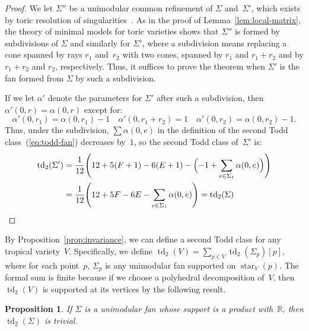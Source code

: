 \documentclass[11pt]{amsart}
\newtheorem{prop}[thm]{Proposition}
\theoremstyle{definition}
\newcommand{\RR}{\mathbb R}
\newcommand{\td}{\operatorname{td}}
\begin{document}
\begin{proof}
We let $\Sigma''$ be a unimodular common refinement of $\Sigma$ and~$\Sigma'$,
which exists by toric resolution of singularities~\cite[Sec.~2.6]{fulton-toric}.
As in the proof of Lemma~\ref{lem:local-matrix}, the theory of
minimal models for toric varieties shows that $\Sigma''$ is formed by
subdivisions of $\Sigma$ and similarly for $\Sigma'$, where a subdivision means
replacing a cone spanned by rays $r_1$ and~$r_2$ with two cones, spanned by
$r_1$ and $r_1 + r_2$ and by $r_1+r_2$ and $r_2$, respectively. Thus, it
suffices to prove the theorem when $\Sigma'$ is the fan formed from $\Sigma$ by
such a subdivision.

If we let $\alpha'$ denote the parameters for $\Sigma'$ after such a
subdivision, then $\alpha'(0,r) = \alpha(0,r)$ except for:
\begin{equation*}
\alpha'(0, r_1) = \alpha(0, r_1) -1 \quad \alpha'(0, r_1 + r_2) = 1
\quad \alpha'(0, r_2) = \alpha(0, r_2) - 1.
\end{equation*}
Thus, under the subdivision, $\sum \alpha(0,e)$ in the definition of the second
Todd class~(\ref{eq:todd-fan}) decreases by~$1$, so the second Todd class
of~$\Sigma'$ is:
\begin{align*}
\td_2(\Sigma') &=
\frac{1}{12} \Bigg( 12 + 5(F+1) - 6(E+1) - \Big({-1} + \sum_{e \in
\Sigma_1} \alpha(0, e)\Big) \Bigg) \\
&=
\frac{1}{12} \Bigg(12 + 5F - 6E - \sum_{e \in \Sigma_1} \alpha(0, e) \Bigg)
= \td_2(\Sigma) \qedhere
\end{align*}
\end{proof}

By Proposition~\ref{prop:invariance}, we can define a second Todd class for any
tropical variety~$V$. Specifically, we define $\td_2(V) = \sum_{p \in
V}\td_2(\Sigma_p)[p]$, where for each point~$p$, $\Sigma_p$ is any unimodular
fan supported on $\operatorname{star}_V(p)$. The formal sum is finite because if
we choose a polyhedral decomposition of~$V$, then $\td_2(V)$ is supported at its
vertices by the following result.

\begin{prop}\label{prop:todd-triviality}
If $\Sigma$ is a unimodular fan whose support is a product with~$\RR$, then
$\td_2(\Sigma)$ is trivial.
\end{prop}
\end{document}
